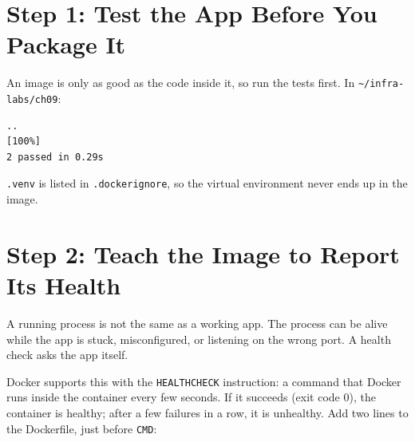 
\section{Step 1: Test the App Before You Package It}\label{09-lab-ship-a-small-python-app-in-a-container:step-1-test-the-app-before-you-package-it}

An image is only as good as the code inside it, so run the tests first. In \texttt{\textasciitilde{}/infra-labs/ch09}:

\begin{codeblock}

\begin{Shaded}
\begin{Highlighting}[]
 
 
\end{Highlighting}
\end{Shaded}

\end{codeblock}

\begin{codeblock}
\begin{Verbatim}[formatcom=\outputstyle]
..                                                                       [100%]
2 passed in 0.29s
\end{Verbatim}
\end{codeblock}

\texttt{.venv} is listed in \texttt{.dockerignore}, so the virtual environment never ends up in the image.

\section{Step 2: Teach the Image to Report Its Health}\label{09-lab-ship-a-small-python-app-in-a-container:step-2-teach-the-image-to-report-its-health}

A running process is not the same as a working app. The process can be alive while the app is stuck, misconfigured, or listening on the wrong port. A health check asks the app itself.

Docker supports this with the \texttt{HEALTHCHECK} instruction: a command that Docker runs inside the container every few seconds. If it succeeds (exit code 0), the container is healthy; after a few failures in a row, it is unhealthy. Add two lines to the Dockerfile, just before \texttt{CMD}:

